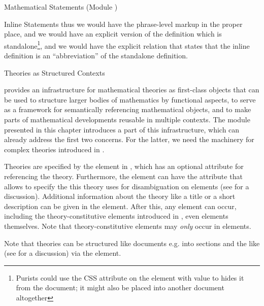 \begin{tchapter}[id=statements,short=Mathematical Statements]{Mathematical Statements (Module {})}
\begin{tsection}[id=inline-statements]{Inline Statements}
thus we would have the phrase-level markup in the proper place, and we would have an
explicit version of the definition which is standalone\footnote{Purists could use the CSS
  attribute {} on the {} element with
  value {} to hides it from the document; it might also
  be placed into another document altogether}, and we would have the explicit relation
that states that the inline definition is an ``abbreviation'' of the standalone
definition.
\end{tsection}

\begin{tsection}[id=theories]{Theories as Structured Contexts}

  {\omdoc} provides an infrastructure for mathematical theories as first-class objects
  that can be used to structure larger bodies of mathematics by functional aspects, to
  serve as a framework for semantically referencing mathematical objects, and to make
  parts of mathematical developments reusable in multiple contexts. The module
  {} presented in this chapter introduces a part of this infrastructure,
  which can already address the first two concerns. For the latter, we need the machinery
  for complex theories introduced in {}.

  Theories are specified by the {} element in {\omdoc}, which has an
  optional {} attribute for referencing the
  theory. Furthermore, the {} element can have the
  {} attribute that allows to specify the
  {} this theory uses for disambiguation on
  {} elements (see {} for a discussion).
  Additional information about the theory like a title or a short description can be given
  in the {} element. After this, any {} {\omdoc}
  element can occur, including the theory-constitutive elements introduced in
  {}, even {} elements
  themselves. Note that theory-constitutive elements may {\emph{only}} occur in
  {} elements.

  Note that theories can be structured like documents e.g. into sections and the like (see
  {} for a discussion) via the {} element.


\end{tsection}
\end{tchapter}
